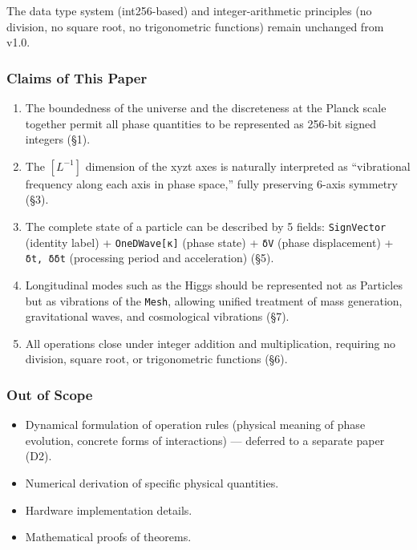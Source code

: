 \documentclass[a4paper,11pt]{article}
\providecommand{\tightlist}{\setlength{\itemsep}{0pt}\setlength{\parskip}{0pt}}
\begin{document}
The data type system (int256-based) and integer-arithmetic principles
(no division, no square root, no trigonometric functions) remain
unchanged from v1.0.

\subsubsection{Claims of This Paper}\label{claims-of-this-paper}

\begin{enumerate}
\def\labelenumi{\arabic{enumi}.}
\tightlist
\item
  The boundedness of the universe and the discreteness at the Planck
  scale together permit all phase quantities to be represented as
  256-bit signed integers (§1).
\item
  The \([L^{-1}]\) dimension of the xyzt axes is naturally interpreted
  as ``vibrational frequency along each axis in phase space,'' fully
  preserving 6-axis symmetry (§3).
\item
  The complete state of a particle can be described by 5 fields:
  \texttt{SignVector} (identity label) + \texttt{OneDWave{[}κ{]}} (phase
  state) + \texttt{δV} (phase displacement) + \texttt{δt,\ δδt}
  (processing period and acceleration) (§5).
\item
  Longitudinal modes such as the Higgs should be represented not as
  Particles but as vibrations of the \texttt{Mesh}, allowing unified
  treatment of mass generation, gravitational waves, and cosmological
  vibrations (§7).
\item
  All operations close under integer addition and multiplication,
  requiring no division, square root, or trigonometric functions (§6).
\end{enumerate}

\subsubsection{Out of Scope}\label{out-of-scope}

\begin{itemize}
\tightlist
\item
  Dynamical formulation of operation rules (physical meaning of phase
  evolution, concrete forms of interactions) --- deferred to a separate
  paper (D2).
\item
  Numerical derivation of specific physical quantities.
\item
  Hardware implementation details.
\item
  Mathematical proofs of theorems.
\end{itemize}
\end{document}
